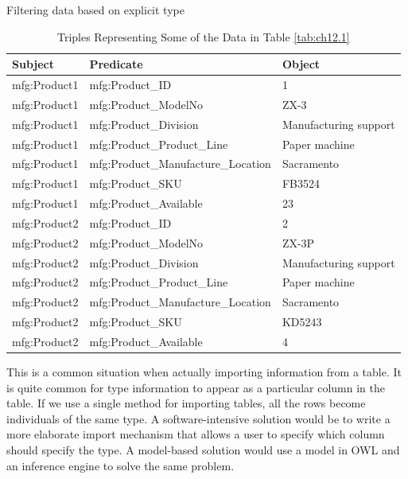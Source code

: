 \begin{challenge}{Filtering data based on explicit type}
\begin{table}[h]
\centering
\begin{tabular}{||l l l ||} 
 \hline
 Subject&Predicate&Object \\ 
 \hline\hline
mfg:Product1&mfg:Product\_ID&1 \\
mfg:Product1&mfg:Product\_ModelNo&ZX-3 \\
mfg:Product1&mfg:Product\_Division&Manufacturing support \\
mfg:Product1&mfg:Product\_Product\_Line&Paper machine \\
mfg:Product1&mfg:Product\_Manufacture\_Location&Sacramento \\
mfg:Product1&mfg:Product\_SKU&FB3524 \\
mfg:Product1&mfg:Product\_Available&23 \\
mfg:Product2&mfg:Product\_ID&2\\
mfg:Product2&mfg:Product\_ModelNo&ZX-3P\\
mfg:Product2&mfg:Product\_Division&Manufacturing support \\
mfg:Product2&mfg:Product\_Product\_Line&Paper machine \\
mfg:Product2&mfg:Product\_Manufacture\_Location&Sacramento\\
mfg:Product2&mfg:Product\_SKU&KD5243\\
mfg:Product2&mfg:Product\_Available&4\\
\hline
\end{tabular}
\caption{Triples Representing Some of the Data in Table \protect\ref{tab:ch12.1}}
\label{tab:ch12.2}
\end{table}

\end{challenge}
This is a common situation when actually importing information from a
table. It is quite common for type information to appear as a particular
column in the table. If we use a single method for importing tables, all
the rows become individuals of the same type. A software-intensive
solution would be to write a more elaborate import mechanism that allows
a user to specify which column should specify the type. A model-based
solution would use a model in OWL and an inference engine to solve the
same problem.


